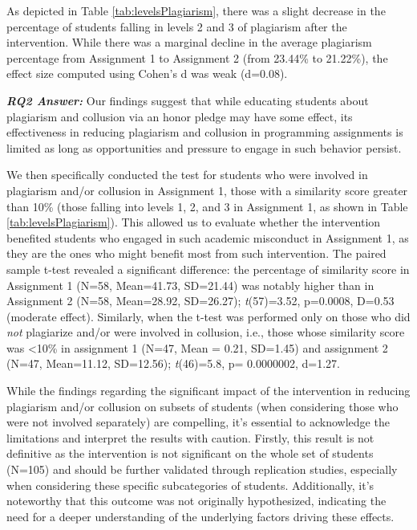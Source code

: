 As depicted in Table \ref{tab:levelsPlagiarism}, there was a slight decrease in the percentage of students falling in levels 2 and 3 of plagiarism after the intervention. While there was a marginal decline in the average plagiarism percentage from Assignment 1 to Assignment 2 (from 23.44\% to 21.22\%), the effect size computed using Cohen's d was weak (d=0.08). 

\vspace{4pt}
\begin{mdframed}
\textbf{\textit{RQ2 Answer:}} Our findings suggest that while educating students about plagiarism and collusion via an honor pledge may have some effect, its effectiveness in reducing plagiarism and collusion in programming assignments is limited as long as opportunities and pressure to engage in such behavior persist.
\end{mdframed}
\vspace{4pt}

We then specifically conducted the test for students who were involved in plagiarism and/or collusion in Assignment 1, those with a similarity score greater than 10\% (those falling into levels 1, 2, and 3 in Assignment 1, as shown in Table \ref{tab:levelsPlagiarism}). This allowed us to evaluate whether the intervention benefited students who engaged in such academic misconduct in Assignment 1, as they are the ones who might benefit most from such intervention. The paired sample t-test revealed a significant difference: the percentage of similarity score in Assignment 1 (N=58, Mean=41.73, SD=21.44) was notably higher than in Assignment 2 (N=58, Mean=28.92, SD=26.27); \textit{t}(57)=3.52, p=0.0008, D=0.53 (moderate effect). Similarly, when the t-test was performed only on those who did \emph{not} plagiarize and/or were involved in collusion, i.e., those whose similarity score was <10\% in assignment 1 (N=47, Mean = 0.21, SD=1.45) and assignment 2 (N=47, Mean=11.12, SD=12.56); \textit{t}(46)=5.8, p= 0.0000002, d=1.27.

While the findings regarding the significant impact of the intervention in reducing plagiarism and/or collusion on subsets of students (when considering those who were not involved separately) are compelling, it's essential to acknowledge the limitations and interpret the results with caution. Firstly, this result is not definitive as the intervention is not significant on the whole set of students (N=105) and should be further validated through replication studies, especially when considering these specific subcategories of students. Additionally, it's noteworthy that this outcome was not originally hypothesized, indicating the need for a deeper understanding of the underlying factors driving these effects.

